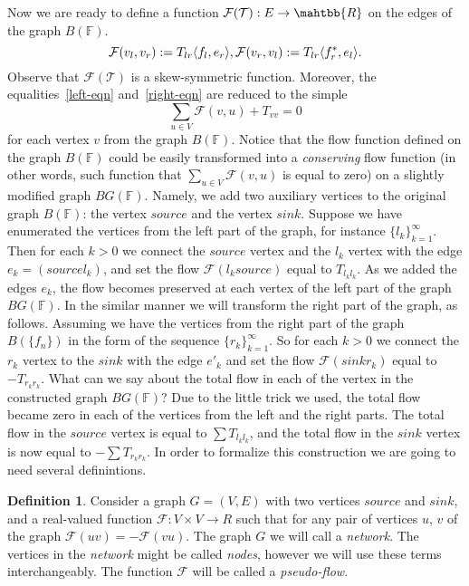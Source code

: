 \documentclass[12pt]{article}
\renewcommand{\cal}[1]{\mathcal{#1}}
\theoremstyle{definition}
\newtheorem{definition}{Definition}
\newcommand{\fsys}{\mathbb{F}}
\numberwithin{remark}{section}
\numberwithin{theorem}{section}
\numberwithin{prop}{section}
\numberwithin{equation}{section}
\numberwithin{lemma}{section}
\numberwithin{prop_under_lemma}{lemma}
\begin{document}
    Now we are ready to define a function $\cal{F(T)}: E \to \mahtbb{R}$ on the edges of the graph $B(\fsys)$.
    \begin{equation*}
        \cal{F}(v_l, v_r) := T_{lr} \langle f_l, e_r \rangle,\\
        \cal{F}(v_r, v_l) := T_{lr} \langle f^*_r, e_l \rangle.
    \end{equation*}
    Observe that $\cal{F(T)}$ is a skew-symmetric function.
    Moreover, the equalities~\eqref{left-eqn} and~\eqref{right-eqn} are reduced to the simple
    \begin{equation}
        \sum_{u \in V} \cal{F}(v, u) + T_{vv} = 0
    \end{equation}
    for each vertex $v$ from the graph $B(\fsys)$.
    Notice that the flow function defined on the graph $B(\fsys)$ could be easily transformed
    into a \textit{conserving} flow function (in other words, such function that $\sum_{u \in V} \cal{F}(v,u)$ is equal to zero)
    on a slightly modified graph $BG(\fsys)$.
    Namely, we add two auxiliary vertices to the original graph $B(\fsys)$:
    the vertex $\mathit{source}$ and the vertex $\mathit{sink}$.
    Suppose we have enumerated the vertices from the left part of the graph, for instance $\{l_k\}_{k=1}^\infty$.
    Then for each $k > 0$ we connect the $\mathit{source}$ vertex and the $l_k$ vertex with
    the edge $e_k = (\mathit{source} l_k)$,
    and set the flow $\cal{F}(l_k source)$ equal to $T_{l_k l_k}$.
    As we added the edges ${e_k}$, the flow becomes preserved at each vertex of the left part of the graph $BG(\fsys)$.
    In the similar manner we will transform the right part of the graph, as follows.
    Assuming we have the vertices from the right part of the graph $B(\{f_n\})$ in the form of the sequence $\{r_k\}_{k=1}^\infty$.
    So for each $k > 0$ we connect the $r_k$ vertex to the $\mathit{sink}$ with the edge $e'_k$
    and set the flow $\cal{F}(\mathit{sink} r_k)$ equal to $-T_{r_k r_k}$.
    What can we say about the total flow in each of the vertex in the constructed graph $BG(\fsys)$?
    Due to the little trick we used, the total flow became zero in each of the vertices from the left and the right parts.
    The total flow in the $\mathit{source}$ vertex is equal to $\sum T_{l_k l_k}$, and the total flow in the
    $\mathit{sink}$ vertex is now equal to $-\sum T_{r_k r_k}$.
    In order to formalize this construction we are going to need several definintions.
    \begin{definition}
        Consider a graph $G = (V, E)$ with two vertices $\mathit{source}$ and
        $\mathit{sink}$, and a real-valued function $\cal{F}: V \times V \to R$ such that
        for any pair of vertices $u$, $v$ of the graph $\cal{F}(uv) = -\cal{F}(vu)$.
        The graph $G$ we will call a \textit{network}.
        The vertices in the \textit{network} might be called \textit{nodes}, however we will use these terms interchangeably.
        The function $\cal{F}$ will be called a \textit{pseudo-flow}.
    \end{definition}
\end{document}
